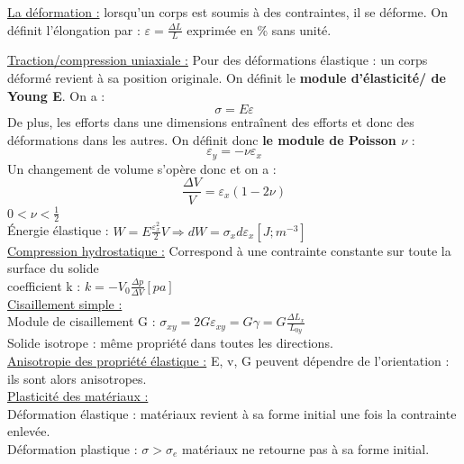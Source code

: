 \documentclass[../main.tex]{subfiles}
\begin{document}
\underline{La déformation :} lorsqu'un corps est soumis à des contraintes, il se déforme. On définit l'élongation par : $\varepsilon = \frac{\Delta L}{L}$ exprimée en \% sans unité.


\quad \underline{Traction/compression uniaxiale :}
Pour des déformations élastique : un corps déformé revient à sa position originale. On définit le \textbf{module d'élasticité/ de Young E}. On a :\\
\begin{equation}
    \sigma = E \varepsilon
\end{equation}
De plus, les efforts dans une dimensions entraînent des efforts et donc des déformations dans les autres. On définit donc \textbf{le module de Poisson $\nu$} : \\
\begin{equation}
    \varepsilon_y = -\nu \varepsilon_x
\end{equation}
 Un changement de volume s'opère donc et on a :\\
 \begin{equation}
     \frac{\Delta V}{V} = \varepsilon_x (1-2\nu)
 \end{equation}
\textbf{$0<\nu<\frac{1}{2}$}\\

Énergie élastique : $W = E \frac{\varepsilon_x^2}{2} V \Rightarrow dW = \sigma_x d\varepsilon_x[J;m^{-3}]$\\

\quad \underline{Compression hydrostatique :} Correspond à une contrainte constante sur toute la surface du solide\\
coefficient k : $k= -V_0 \frac{\Delta p}{\Delta V}[pa]$\\

\quad \underline{Cisaillement simple :}\\
Module de cisaillement G : $\sigma_{xy} = 2G \varepsilon_{xy} = G\gamma = G \frac{\Delta L_x}{L_{0y}}$\\
Solide isotrope : même propriété dans toutes les directions. \\

\quad  \underline{Anisotropie des propriété élastique :}
E, v, G peuvent dépendre de l'orientation : ils sont alors anisotropes. \\

\quad \underline{Plasticité des matériaux :}\\
Déformation élastique : matériaux revient à sa forme initial une fois la contrainte enlevée.\\
Déformation plastique : $\sigma > \sigma_e$ matériaux ne retourne pas à sa forme initial.\\
\end{document}
